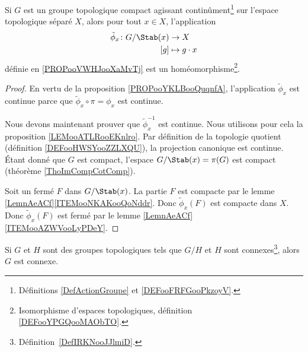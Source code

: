 \begin{theorem}     \label{ThojrLKZk}
	Si \( G\) est un groupe topologique compact agissant continûment\footnote{Définitions \ref{DefActionGroupe} et \ref{DEFooFRFGooPkzoyV}.} sur l'espace topologique séparé \( X\), alors pour tout \( x\in X\), l'application
	\begin{equation}
		\begin{aligned}
			\tilde \phi_x\colon G/\Stab(x) & \to X            \\
			[g]                            & \mapsto g\cdot x
		\end{aligned}
	\end{equation}
	définie en \ref{PROPooVWHJooXaMvTj} est un homéomorphisme\footnote{Isomorphisme d'espaces topologiques, définition \ref{DEFooYPGQooMAObTO}.}.
\end{theorem}

\begin{proof}
	En vertu de la proposition \ref{PROPooYKLBooQuqnfA}, l'application \( \tilde \phi_x\) est continue parce que \( \tilde \phi_x\circ\pi=\phi_x\) est continue.

	Nous devons maintenant prouver que \( \tilde \phi_x^{-1}\) est continue. Nous utilisons pour cela la proposition \ref{LEMooATLRooEKnlro}. Par définition de la topologie quotient (définition \ref{DEFooHWSYooZZLXQU}), la projection canonique est continue. Étant donné que \( G\) est compact, l'espace \( G/\Stab(x)=\pi(G)\) est compact (théorème \ref{ThoImCompCotComp}).

	Soit un fermé \( F\) dans \( G/\Stab(x)\). La partie \( F\) est compacte par le lemme \ref{LemnAeACf}\ref{ITEMooNKAKooQoNddr}. Donc \( \tilde \phi_x(F)\) est compacte dans \( X\). Donc \( \tilde \phi_x(F)\) est fermé par le lemme \ref{LemnAeACf}\ref{ITEMooAZWVooLyPDeY}.
\end{proof}

\begin{lemma}       \label{LemkLRAet}
	Si \( G\) et \( H\) sont des groupes topologiques tels que \( G/H\) et \( H\) sont connexes\footnote{Définition~\ref{DefIRKNooJJlmiD}.}, alors \( G\) est connexe.
\end{lemma}

